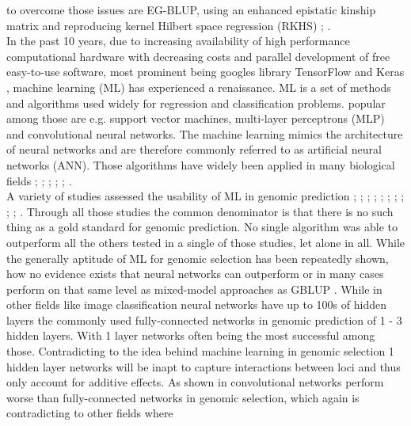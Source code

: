 to overcome those issues are EG-BLUP, using an enhanced epistatic kinship matrix and reproducing kernel
Hilbert space regression (RKHS) \cite{jiang2015}; \cite{martini2017genomic}. \\
In the past 10 years, due to increasing availability of high performance computational hardware with
decreasing costs and parallel development of free easy-to-use software, most prominent being googles library
TensorFlow \cite{TF2016} and Keras \cite{keras2015}, machine learning (ML) has experienced a renaissance. ML
is a set of methods and algorithms used widely for regression and classification problems. popular among those
are e.g. support vector machines, multi-layer perceptrons (MLP) and convolutional neural networks. The machine
learning mimics the architecture of neural networks and are therefore commonly referred to as artificial
neural networks (ANN). Those algorithms have widely been applied in many biological fields \cite{min2017deep};
\cite{lan2018survey}; \cite{mamoshina2016applications}; \cite{angermueller2016}; \cite{webb2018deep};
\cite{rampasek2016tensorflow}. \\
A variety of studies assessed the usability of ML in genomic prediction \cite{gonzalez2018applications};
\cite{gonza2016}; \cite{ogutu2011comparison}; \cite{montesinos2019benchmarking};
\cite{grinberg2018evaluation}; \cite{cuevas2019deep}; \cite{montesinos2019new}; \cite{ma2017deepgs};
\cite{qiu2016application}; \cite{gonza2012}; \cite{li2018genomic}. Through all those studies the common
denominator is that there is no such thing as a gold standard for genomic prediction. No single algorithm was
able to outperform all the others tested in a single of those studies, let alone in all. While the generally
aptitude of ML for genomic selection has been repeatedly shown, how no evidence exists that neural networks
can outperform or in many cases perform on that same level as mixed-model approaches as GBLUP
\cite{hayes2001}. While in other fields like image classification neural networks have up to 100s of hidden
layers \cite{he2016deep} the commonly used fully-connected networks in genomic prediction of 1 - 3 hidden
layers. With 1 layer networks often being the most successful among those. Contradicting to the idea behind
machine learning in genomic selection 1 hidden layer networks will be inapt to capture interactions between
loci and thus only account for additive effects. As shown in \cite{azodi2019} convolutional networks perform
worse than fully-connected networks in genomic selection, which again is contradicting to other fields where

